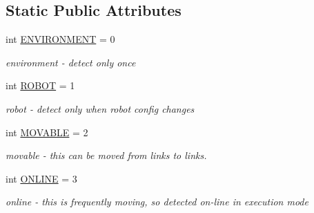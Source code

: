 \subsection*{Static Public Attributes}
\begin{DoxyCompactItemize}
\item 
\mbox{\label{classrnb-planning_1_1src_1_1pkg_1_1detector_1_1detector__interface_1_1_detection_level_adeaf3c56f66937699df395f2dc94502c}} 
int \hyperlink{classrnb-planning_1_1src_1_1pkg_1_1detector_1_1detector__interface_1_1_detection_level_adeaf3c56f66937699df395f2dc94502c}{E\+N\+V\+I\+R\+O\+N\+M\+E\+NT} = 0
\begin{DoxyCompactList}\small\item\em environment -\/ detect only once \end{DoxyCompactList}\item 
\mbox{\label{classrnb-planning_1_1src_1_1pkg_1_1detector_1_1detector__interface_1_1_detection_level_ab96c534a83c71d20519d5c6ba4bce95c}} 
int \hyperlink{classrnb-planning_1_1src_1_1pkg_1_1detector_1_1detector__interface_1_1_detection_level_ab96c534a83c71d20519d5c6ba4bce95c}{R\+O\+B\+OT} = 1
\begin{DoxyCompactList}\small\item\em robot -\/ detect only when robot config changes \end{DoxyCompactList}\item 
int \hyperlink{classrnb-planning_1_1src_1_1pkg_1_1detector_1_1detector__interface_1_1_detection_level_a8f69b4736ec3eeafd95a3ae9d612d757}{M\+O\+V\+A\+B\+LE} = 2
\begin{DoxyCompactList}\small\item\em movable -\/ this can be moved from links to links. \end{DoxyCompactList}\item 
\mbox{\label{classrnb-planning_1_1src_1_1pkg_1_1detector_1_1detector__interface_1_1_detection_level_ab3d7fd6fb6af6197636095e04e665b80}} 
int \hyperlink{classrnb-planning_1_1src_1_1pkg_1_1detector_1_1detector__interface_1_1_detection_level_ab3d7fd6fb6af6197636095e04e665b80}{O\+N\+L\+I\+NE} = 3
\begin{DoxyCompactList}\small\item\em online -\/ this is frequently moving, so detected on-\/line in execution mode \end{DoxyCompactList}\end{DoxyCompactItemize}


